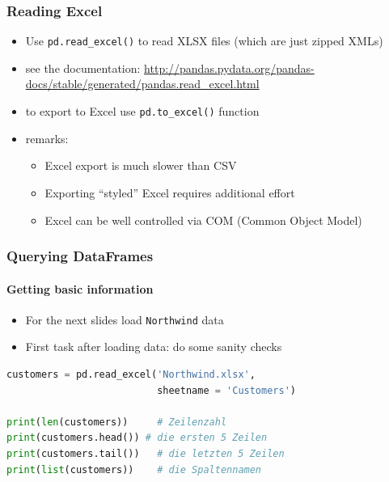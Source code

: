 \documentclass[12pt,ngerman]{beamer}
\newcommand{\pyc}[1]{\lstinline[language={Python}]{#1}}
\begin{document}
\begin{frame}
\frametitle{Reading Excel}

\begin{itemize}
\item Use \pyc{pd.read_excel()} to read XLSX files (which are just zipped XMLs)
\item see the documentation: \url{http://pandas.pydata.org/pandas-docs/stable/generated/pandas.read_excel.html}
\item to export to Excel use \pyc{pd.to_excel()} function
\item remarks:
\begin{itemize}
	\item Excel export is much slower than CSV
	\item Exporting \enquote{styled} Excel requires additional effort
	\item Excel can be well controlled via COM (Common Object Model) 
\end{itemize}
\end{itemize}
\end{frame}

\begin{frame}[fragile]
\frametitle{Querying DataFrames}
\framesubtitle{Getting basic information}

\begin{itemize}
	\item For the next slides load \texttt{Northwind} data
	\item First task after loading data: do some sanity checks
\end{itemize}

\begin{lstlisting}[language={Python}]
customers = pd.read_excel('Northwind.xlsx',
                          sheetname = 'Customers')

print(len(customers))     # Zeilenzahl
print(customers.head()) # die ersten 5 Zeilen
print(customers.tail())   # die letzten 5 Zeilen
print(list(customers))    # die Spaltennamen
\end{lstlisting}
\end{frame}

%
%
\end{document}
